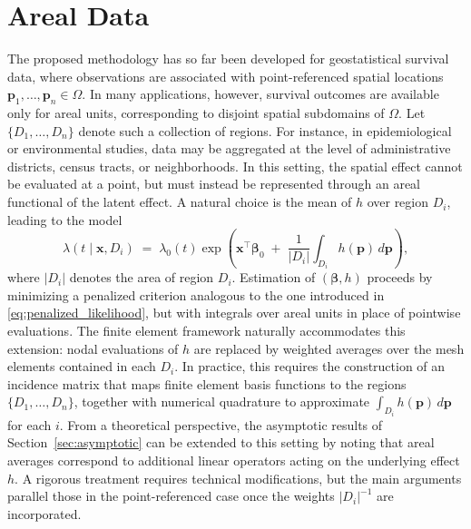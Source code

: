 \documentclass[11pt]{article}
\begin{document}
\section{Areal Data}\label{sec:areal}
The proposed methodology has so far been developed for geostatistical survival data, where observations are associated with point-referenced spatial locations $\bm{p}_1, \dots, \bm{p}_n \in \Omega$. In many applications, however, survival outcomes are available only for areal units, corresponding to disjoint spatial subdomains of $\Omega$. Let $\{D_1, \dots, D_n\}$ denote such a collection of regions. For instance, in epidemiological or environmental studies, data may be aggregated at the level of administrative districts, census tracts, or neighborhoods. In this setting, the spatial effect cannot be evaluated at a point, but must instead be represented through an areal functional of the latent effect. A natural choice is the mean of $h$ over region $D_i$, leading to the model \[ \lambda(t \mid \bm x, D_i) \;=\; \lambda_0(t) \exp\!\left( \bm{x}^\top \bm{\beta}_0 \;+\; \frac{1}{|D_i|}\int_{D_i} h(\bm p)\,d\bm p \right), \] where $|D_i|$ denotes the area of region $D_i$. Estimation of $(\bm\beta,h)$ proceeds by minimizing a penalized criterion analogous to the one introduced in \eqref{eq:penalized_likelihood}, but with integrals over areal units in place of pointwise evaluations. The finite element framework naturally accommodates this extension: nodal evaluations of $h$ are replaced by weighted averages over the mesh elements contained in each $D_i$. In practice, this requires the construction of an incidence matrix that maps finite element basis functions to the regions $\{D_1,\dots,D_n\}$, together with numerical quadrature to approximate $\int_{D_i} h(\bm p)\,d\bm p$ for each $i$. From a theoretical perspective, the asymptotic results of Section~\ref{sec:asymptotic} can be extended to this setting by noting that areal averages correspond to additional linear operators acting on the underlying effect $h$. A rigorous treatment requires technical modifications, but the main arguments parallel those in the point-referenced case once the weights $|D_i|^{-1}$ are incorporated. 
	
\end{document}
